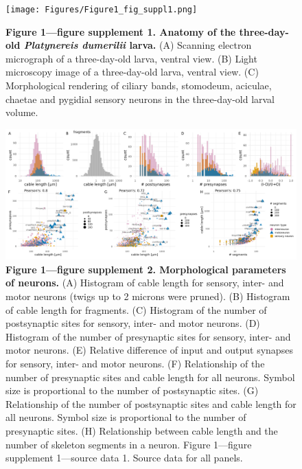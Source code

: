 \documentclass[
  11pt,
]{article}
\begin{document}
\begin{figure}[H]

{\centering \texttt{[image: Figures/Figure1\_fig\_suppl1.png]}

}

\caption{\textbf{Figure 1---figure supplement 1. Anatomy of the
three-day-old \emph{Platynereis dumerilii} larva.} (A) Scanning electron
micrograph of a three-day-old larva, ventral view. (B) Light microscopy
image of a three-day-old larva, ventral view. (C) Morphological
rendering of ciliary bands, stomodeum, aciculae, chaetae and pygidial
sensory neurons in the three-day-old larval volume.}

\end{figure}%

\begin{figure}[H]

{\centering \includegraphics[width=1\textwidth,height=\textheight]{Figures/Figure1_fig_suppl2.png}

}

\caption{\textbf{Figure 1---figure supplement 2. Morphological
parameters of neurons.} (A) Histogram of cable length for sensory,
inter- and motor neurons (twigs up to 2 microns were pruned). (B)
Histogram of cable length for fragments. (C) Histogram of the number of
postsynaptic sites for sensory, inter- and motor neurons. (D) Histogram
of the number of presynaptic sites for sensory, inter- and motor
neurons. (E) Relative difference of input and output synapses for
sensory, inter- and motor neurons. (F) Relationship of the number of
presynaptic sites and cable length for all neurons. Symbol size is
proportional to the number of postsynaptic sites. (G) Relationship of
the number of postsynaptic sites and cable length for all neurons.
Symbol size is proportional to the number of presynaptic sites. (H)
Relationship between cable length and the number of skeleton segments in
a neuron. Figure 1---figure supplement 1---source data 1. Source data
for all panels.}

\end{figure}%
\end{document}
